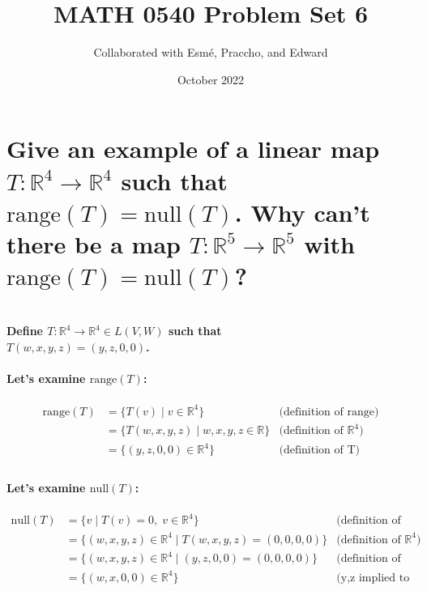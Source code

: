 \documentclass{article}
\title{MATH 0540 Problem Set 6}
\author{Collaborated with Esmé, Praccho, and Edward}
\date{October 2022}
\begin{document}
\maketitle

\section{Give an example of a linear map $T: \mathbb{R}^4 \rightarrow \mathbb{R}^4$ such that $\mathrm{range}(T) = \mathrm{null}(T)$. Why can't there be a map $T: \mathbb{R}^5 \rightarrow \mathbb{R}^5$ with $\mathrm{range}(T) = \mathrm{null}(T)$?}

\paragraph{\large
\\Define $T: \mathbb{R}^4 \rightarrow \mathbb{R}^4 \in L(V, W)$ such that
\\ $T(w, x, y, z) = (y, z, 0, 0)$.}

\paragraph{\large
Let's examine $\mathrm{range}(T)$:}

\begin{align*}
    \mathrm{range}(T) &= \{T(v)\;|\;v \in \mathbb{R}^4\} & \text{(definition of range)}\\
    &= \{T(w, x, y, z)\;|\;w,x,y,z \in \mathbb{R}\} & \text{(definition of $\mathbb{R}^4$)}\\
    &= \{(y, z, 0, 0) \in \mathbb{R}^4\} & \text{(definition of T)}\\
\end{align*}

\paragraph{\large
Let's examine $\mathrm{null}(T)$:}

\begin{align*}
    \mathrm{null}(T) &= \{v\;|\;T(v) = 0,\;v \in \mathbb{R}^4\} & \text{(definition of null space)}\\
    &= \{(w, x, y, z) \in \mathbb{R}^4\;|\;T(w, x, y, z) = (0,0,0,0)\} & \text{(definition of $\mathbb{R}^4$)}\\
    &= \{(w, x, y, z) \in \mathbb{R}^4\;|\;(y, z, 0, 0) = (0,0,0,0)\} & \text{(definition of T)}\\
    &= \{(w, x, 0, 0) \in \mathbb{R}^4\} & \text{(y,z implied to be 0)}
\end{align*}
\end{document}
